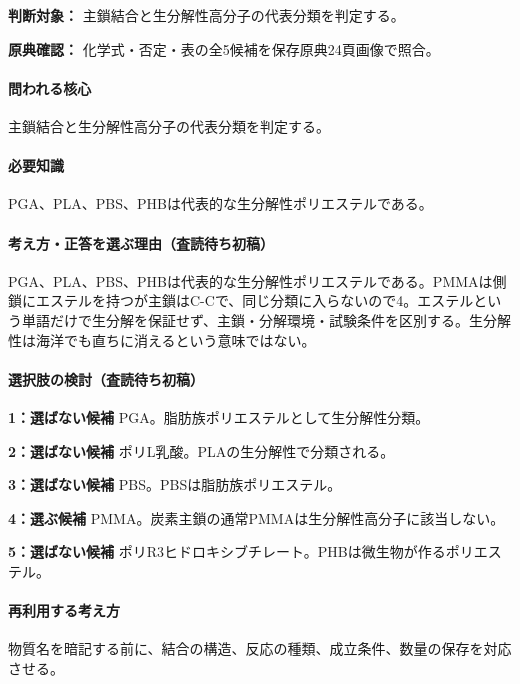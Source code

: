 \noindent\textbf{判断対象：} 主鎖結合と生分解性高分子の代表分類を判定する。\par

\noindent\textbf{原典確認：} 化学式・否定・表の全5候補を保存原典24頁画像で照合。\par

\paragraph{問われる核心} 主鎖結合と生分解性高分子の代表分類を判定する。

\paragraph{必要知識} PGA、PLA、PBS、PHBは代表的な生分解性ポリエステルである。

\paragraph{考え方・正答を選ぶ理由（査読待ち初稿）} PGA、PLA、PBS、PHBは代表的な生分解性ポリエステルである。PMMAは側鎖にエステルを持つが主鎖はC-Cで、同じ分類に入らないので4。エステルという単語だけで生分解を保証せず、主鎖・分解環境・試験条件を区別する。生分解性は海洋でも直ちに消えるという意味ではない。

\paragraph{選択肢の検討（査読待ち初稿）}\mbox{}\par

\noindent\textbf{1：選ばない候補} PGA。脂肪族ポリエステルとして生分解性分類。\par

\noindent\textbf{2：選ばない候補} ポリL乳酸。PLAの生分解性で分類される。\par

\noindent\textbf{3：選ばない候補} PBS。PBSは脂肪族ポリエステル。\par

\noindent\textbf{4：選ぶ候補} PMMA。炭素主鎖の通常PMMAは生分解性高分子に該当しない。\par

\noindent\textbf{5：選ばない候補} ポリR3ヒドロキシブチレート。PHBは微生物が作るポリエステル。\par

\paragraph{再利用する考え方} 物質名を暗記する前に、結合の構造、反応の種類、成立条件、数量の保存を対応させる。

